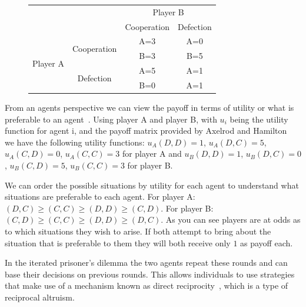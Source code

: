 \documentclass[]{final_report}
\begin{document}
\begin{figure}
\vspace{-20pt}
\begin{framed}
	\begin{center}
		\begin{tabular}{cc|c|c}
		& & \multicolumn{2}{c}{Player B}\\
		& & Cooperation & Defection\\
		\cline{1-4}
		\multirow{4}{*}{Player A} &\multirow{2}{*}{Cooperation} & A=3 & A=0\\
		& & B=3 & B=5\\
		\cline{2-4}
		& \multirow{2}{*}{Defection} & A=5 & A=1\\
		& & B=0 & A=1\\
		\end{tabular}
		\label{tab:payoffmatrix}
	\end{center}	
\end{framed}
\vspace{-20pt}
\end{figure}
From an agents perspective we can view the payoff in terms of utility or what is preferable to an agent~\cite{wooldridge2009introduction}. Using player A and player B, with $u_i$ being the utility function for agent i, and the payoff matrix provided by Axelrod and Hamilton~\cite{evolution_of_cooperation} we have the following utility functions: $u_A(D,D)=1$, $u_A(D,C)=5$, $u_A(C,D)=0$, $u_A(C,C)=3$ for player A and $u_B(D,D)=1$, $u_B(D,C)=0$, $u_B(C,D)=5$, $u_B(C,C)=3$ for player B.\par 
We can order the possible situations by utility for each agent to understand what situations are preferable to each agent. For player A: $(D,C)\ge (C,C)\ge (D,D)\ge (C,D)$. For player B: $(C,D)\ge (C,C)\ge (D,D)\ge (D,C)$. As you can see players are at odds as to which situations they wish to arise. If both attempt to bring about the situation that is preferable to them they will both receive only $1$ as payoff each.\par 
In the iterated prisoner's dilemma the two agents repeat these rounds and can base their decisions on previous rounds. This allows individuals to use strategies that make use of a mechanism known as direct reciprocity~\cite{five_rules_coop}, which is a type of reciprocal altruism.\par 
\end{document}
